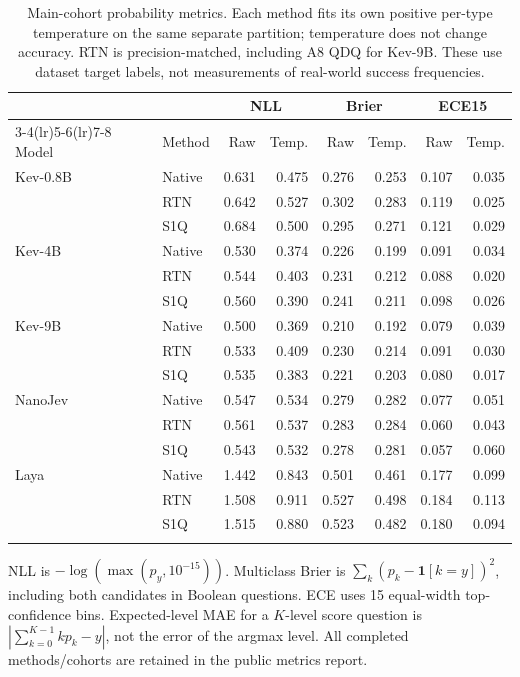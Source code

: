 \documentclass[10pt,twocolumn]{article}
\begin{document}
\begin{table}[t]
\centering\small
\begin{tabular}{llrrrrrr}
\toprule
 & & \multicolumn{2}{c}{NLL} & \multicolumn{2}{c}{Brier}
 & \multicolumn{2}{c}{ECE15}\\
\cmidrule(lr){3-4}\cmidrule(lr){5-6}\cmidrule(lr){7-8}
Model & Method & Raw & Temp. & Raw & Temp. & Raw & Temp.\\
\midrule
Kev-0.8B & Native & 0.631 & 0.475 & 0.276 & 0.253 & 0.107 & 0.035 \\
 & RTN & 0.642 & 0.527 & 0.302 & 0.283 & 0.119 & 0.025 \\
 & S1Q & 0.684 & 0.500 & 0.295 & 0.271 & 0.121 & 0.029 \\
\addlinespace
Kev-4B & Native & 0.530 & 0.374 & 0.226 & 0.199 & 0.091 & 0.034 \\
 & RTN & 0.544 & 0.403 & 0.231 & 0.212 & 0.088 & 0.020 \\
 & S1Q & 0.560 & 0.390 & 0.241 & 0.211 & 0.098 & 0.026 \\
\addlinespace
Kev-9B & Native & 0.500 & 0.369 & 0.210 & 0.192 & 0.079 & 0.039 \\
 & RTN & 0.533 & 0.409 & 0.230 & 0.214 & 0.091 & 0.030 \\
 & S1Q & 0.535 & 0.383 & 0.221 & 0.203 & 0.080 & 0.017 \\
\addlinespace
NanoJev & Native & 0.547 & 0.534 & 0.279 & 0.282 & 0.077 & 0.051 \\
 & RTN & 0.561 & 0.537 & 0.283 & 0.284 & 0.060 & 0.043 \\
 & S1Q & 0.543 & 0.532 & 0.278 & 0.281 & 0.057 & 0.060 \\
\addlinespace
Laya & Native & 1.442 & 0.843 & 0.501 & 0.461 & 0.177 & 0.099 \\
 & RTN & 1.508 & 0.911 & 0.527 & 0.498 & 0.184 & 0.113 \\
 & S1Q & 1.515 & 0.880 & 0.523 & 0.482 & 0.180 & 0.094 \\
\addlinespace
\bottomrule
\end{tabular}
\caption{Main-cohort probability metrics. Each method fits its own
positive per-type temperature on the same separate partition;
temperature does not change accuracy. RTN is precision-matched,
including A8 QDQ for Kev-9B. These use dataset target labels,
not measurements of real-world success frequencies.}
\label{tab:prob}
\end{table}

NLL is $-\log(\max(p_y,10^{-15}))$. Multiclass Brier is
$\sum_k(p_k-\mathbf 1[k=y])^2$, including both candidates in
Boolean questions. ECE uses 15 equal-width top-confidence bins.
Expected-level MAE for a $K$-level score question is
$|\sum_{k=0}^{K-1}kp_k-y|$, not the error of the argmax level.
All completed methods/cohorts are retained in the public metrics report.
\end{document}
